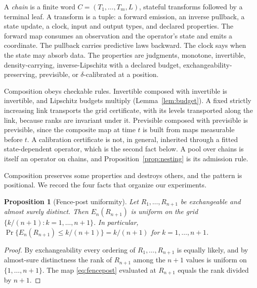 \documentclass[11pt]{article}
\newtheorem{proposition}{Proposition}
\theoremstyle{remark}
\begin{document}
A \emph{chain} is a finite word
$C = (T_1, \dots, T_m, L)$, stateful transforms followed by a terminal leaf. A
transform is a tuple: a forward emission, an inverse pullback, a state update, a clock,
input and output types, and declared properties. The forward map consumes an
observation and the operator's state and emits a coordinate. The pullback carries
predictive laws backward. The clock says when the state may absorb data. The properties
are judgments, monotone, invertible, density-carrying, inverse-Lipschitz with a
declared budget, exchangeability-preserving, previsible, or $\delta$-calibrated at a position.

Composition obeys checkable rules. Invertible composed with invertible is invertible,
and Lipschitz budgets multiply (Lemma~\ref{lem:budget}). A fixed strictly increasing link
transports the grid certificate, with its levels transported along the link, because
ranks are invariant under it.
Previsible composed with previsible is previsible, since the composite map at time $t$
is built from maps measurable before $t$. A calibration certificate is not, in
general, inherited through a fitted state-dependent operator, which is the second fact
below. A pool over chains is itself an operator on chains, and
Proposition~\ref{prop:nesting} is its admission rule.

Composition preserves some properties and destroys others, and the pattern is
positional. We record the four facts that organize our experiments.

\begin{proposition}[Fence-post uniformity]\label{prop:uniform}
Let $R_1, \dots, R_{n+1}$ be exchangeable and almost surely distinct. Then
$E_n(R_{n+1})$ is uniform on the grid $\{k/(n+1) : k = 1, \dots, n+1\}$. In
particular, $\Pr\{E_n(R_{n+1}) \le k/(n+1)\} = k/(n+1)$ for
$k = 1, \dots, n+1$.
\end{proposition}

\begin{proof}
By exchangeability every ordering of $R_1, \dots, R_{n+1}$ is equally likely, and by
almost-sure distinctness the rank of $R_{n+1}$ among the $n+1$ values is uniform on
$\{1, \dots, n+1\}$. The map \eqref{eq:fencepost} evaluated at $R_{n+1}$ equals the rank
divided by $n+1$.
\end{proof}
\end{document}
